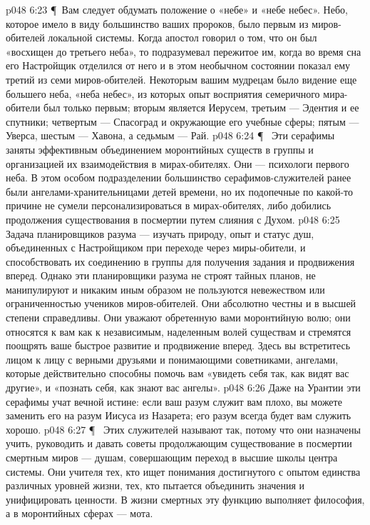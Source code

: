\vs p048 6:23 \P\ Вам следует обдумать положение о «небе» и «небе небес». Небо, которое имело в виду большинство ваших пророков, было первым из миров\hyp{}обителей локальной системы. Когда апостол говорил о том, что он был «восхищен до третьего неба», то подразумевал пережитое им, когда во время сна его Настройщик отделился от него и в этом необычном состоянии показал ему третий из семи миров\hyp{}обителей. Некоторым вашим мудрецам было видение еще большего неба, «неба небес», из которых опыт восприятия семеричного мира\hyp{}обители был только первым; вторым является Иерусем, третьим --- Эдентия и ее спутники; четвертым --- Спасоград и окружающие его учебные сферы; пятым --- Уверса, шестым --- Хавона, а седьмым --- Рай.
\vs p048 6:24 \P\ \bibnobreakspace {} Эти серафимы заняты эффективным объединением моронтийных существ в группы и организацией их взаимодействия в мирах\hyp{}обителях. Они --- психологи первого неба. В этом особом подразделении большинство серафимов\hyp{}служителей ранее были ангелами\hyp{}хранительницами детей времени, но их подопечные по какой\hyp{}то причине не сумели персонализироваться в мирах\hyp{}обителях, либо добились продолжения существования в посмертии путем слияния с Духом.
\vs p048 6:25 Задача планировщиков разума --- изучать природу, опыт и статус душ, объединенных с Настройщиком при переходе через миры\hyp{}обители, и способствовать их соединению в группы для получения задания и продвижения вперед. Однако эти планировщики разума не строят тайных планов, не манипулируют и никаким иным образом не пользуются невежеством или ограниченностью учеников миров\hyp{}обителей. Они абсолютно честны и в высшей степени справедливы. Они уважают обретенную вами моронтийную волю; они относятся к вам как к независимым, наделенным волей существам и стремятся поощрять ваше быстрое развитие и продвижение вперед. Здесь вы встретитесь лицом к лицу с верными друзьями и понимающими советниками, ангелами, которые действительно способны помочь вам «увидеть себя так, как видят вас другие», и «познать себя, как знают вас ангелы».
\vs p048 6:26 Даже на Урантии эти серафимы учат вечной истине: если ваш разум служит вам плохо, вы можете заменить его на разум Иисуса из Назарета; его разум всегда будет вам служить хорошо.
\vs p048 6:27 \P\ \bibnobreakspace {} Этих служителей называют так, потому что они назначены учить, руководить и давать советы продолжающим существование в посмертии смертным миров --- душам, совершающим переход в высшие школы центра системы. Они учителя тех, кто ищет понимания достигнутого с опытом единства различных уровней жизни, тех, кто пытается объединить значения и унифицировать ценности. В жизни смертных эту функцию выполняет философия, а в моронтийных сферах --- мота.
